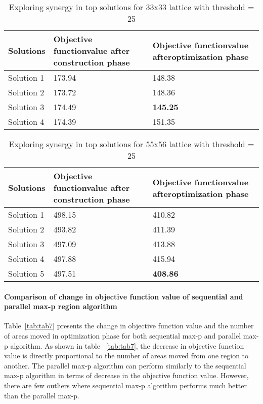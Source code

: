\documentclass[conference]{IEEEtran}
\begin{document}
\begin{table*}[!htbp] 
\begin{center}
\begin{tabular}{|C{1.4cm}|C{1.4cm}|C{1.4cm}|}
\hline
Solutions & Objective function\newline value after \newline construction phase & Objective function\newline value after\newline optimization phase\\
\hline
Solution 1 & 173.94 & 148.38\\
\hline
Solution 2 & 173.72 & 148.36\\
\hline
Solution 3 & 174.49 & \textbf{145.25}\\
\hline
Solution 4 & 174.39 & 151.35\\
\hline
\end{tabular}
\caption{Exploring synergy in top solutions for 33x33 lattice with threshold = 25}
\label{tab:tab9}
\end{center}
\end{table*}

\begin{table}[!htbp]
\begin{center}
\begin{tabular}{|C{1.4cm}|C{1.4cm}|C{1.4cm}|}
\hline
Solutions & Objective function\newline value after \newline construction phase & Objective function\newline value after\newline optimization phase\\
\hline
Solution 1 & 498.15 & 410.82\\
\hline
Solution 2 & 493.82 & 411.39\\
\hline
Solution 3 & 497.09 & 413.88\\
\hline
Solution 4 & 497.88 & 415.94\\
\hline
Solution 5 & 497.51 & \textbf{408.86}\\
\hline
\end{tabular}
\caption{Exploring synergy in top solutions for 55x56 lattice with threshold = 25}
\label{tab:tab10}
\end{center}
\end{table}

\paragraph{Comparison of change in objective function value of sequential and parallel max-p region algorithm}
Table~\ref{tab:tab7} presents the change in objective function value and the number
of areas moved in optimization phase for both sequential max-p and parallel
max-p algorithm. As shown in table ~\ref{tab:tab7}, the decrease in objective
function value is directly proportional to the number of areas moved from one
region to another. The parallel max-p algorithm can perform similarly to
the sequential max-p algorithm in terms of decrease in the objective function
value. However, there are few outliers where sequential max-p algorithm performs
much better than the parallel max-p.
\end{document}
